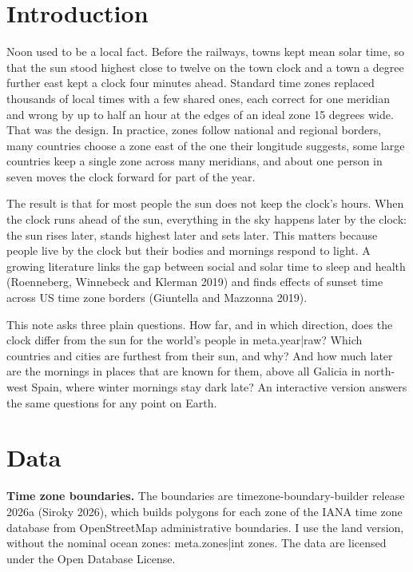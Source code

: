 \documentclass[11pt,a4paper]{article}
\begin{document}
\section{Introduction}

Noon used to be a local fact. Before the railways, towns kept mean solar time, so that the sun stood highest close to twelve on the town clock and a town a degree further east kept a clock four minutes ahead. Standard time zones replaced thousands of local times with a few shared ones, each correct for one meridian and wrong by up to half an hour at the edges of an ideal zone 15 degrees wide. That was the design. In practice, zones follow national and regional borders, many countries choose a zone east of the one their longitude suggests, some large countries keep a single zone across many meridians, and about one person in seven moves the clock forward for part of the year.

The result is that for most people the sun does not keep the clock's hours. When the clock runs ahead of the sun, everything in the sky happens later by the clock: the sun rises later, stands highest later and sets later. This matters because people live by the clock but their bodies and mornings respond to light. A growing literature links the gap between social and solar time to sleep and health (Roenneberg, Winnebeck and Klerman 2019) and finds effects of sunset time across US time zone borders (Giuntella and Mazzonna 2019).

This note asks three plain questions. How far, and in which direction, does the clock differ from the sun for the world's people in {{meta.year|raw}}? Which countries and cities are furthest from their sun, and why? And how much later are the mornings in places that are known for them, above all Galicia in north-west Spain, where winter mornings stay dark late? An interactive version answers the same questions for any point on Earth.

\section{Data}

\textbf{Time zone boundaries.} The boundaries are timezone-boundary-builder release 2026a (Siroky 2026), which builds polygons for each zone of the IANA time zone database from OpenStreetMap administrative boundaries. I use the land version, without the nominal ocean zones: {{meta.zones|int}} zones. The data are licensed under the Open Database License.
\end{document}
